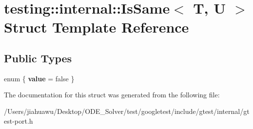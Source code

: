 \hypertarget{structtesting_1_1internal_1_1_is_same}{}\section{testing\+:\+:internal\+:\+:Is\+Same$<$ T, U $>$ Struct Template Reference}
\label{structtesting_1_1internal_1_1_is_same}
\subsection*{Public Types}
\begin{DoxyCompactItemize}
\item 
\mbox{\label{structtesting_1_1internal_1_1_is_same_acebf1dabd866eb05f295125a4991d9ba}} 
enum \{ {\bfseries value} = false
 \}
\end{DoxyCompactItemize}


The documentation for this struct was generated from the following file\+:\begin{DoxyCompactItemize}
\item 
/\+Users/jiahuawu/\+Desktop/\+O\+D\+E\+\_\+\+Solver/test/googletest/include/gtest/internal/gtest-\/port.\+h\end{DoxyCompactItemize}
